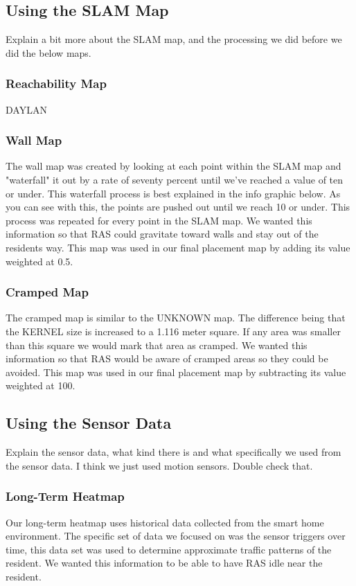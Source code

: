 \documentclass[11pt, conference, a4paper]{IEEEtran}
\begin{document}
\subsection{Using the SLAM Map}
Explain a bit more about the SLAM map, and the processing we did before we did the below maps.


\subsubsection{Reachability Map}
DAYLAN


\subsubsection{Wall Map}
The wall map was created by looking at each point within the SLAM map and "waterfall" it out by a rate of seventy percent until we've reached a value of ten or under. This waterfall process is best explained in the info graphic below. As you can see with this, the points are pushed out until we reach 10 or under. This process was repeated for every point in the SLAM map. We wanted this information so that RAS could gravitate toward walls and stay out of the residents way. 
This map was used in our final placement map by adding its value weighted at 0.5.


\subsubsection{Cramped Map}
The cramped map is similar to the UNKNOWN map. The difference being that the KERNEL size is increased to a 1.116 meter square. If any area was smaller than this square we would mark that area as cramped. We wanted this information so that RAS would be aware of cramped areas so they could be avoided. 
This map was used in our final placement map by subtracting its value weighted at 100.


\subsection{Using the Sensor Data}
Explain the sensor data, what kind there is and what specifically we used from the sensor data. I think we just used motion sensors. Double check that. 


\subsubsection{Long-Term Heatmap}
Our long-term heatmap uses historical data collected from the smart home environment. The specific set of data we focused on was the sensor triggers over time, this data set was used to determine approximate traffic patterns of the resident. We wanted this information to be able to have RAS idle near the resident.
\end{document}
